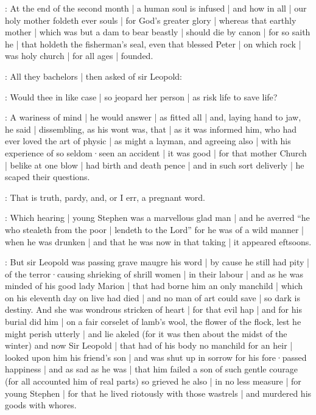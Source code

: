 \stephen:
At the end of the second month |
a human soul is infused |
and how in all |
our holy mother foldeth ever souls |
for God's greater glory |
whereas that earthly mother |
which was but a dam to bear beastly |
should die by canon |
for so saith he |
that holdeth the fisherman's seal,
even that blessed Peter |
on which rock |
was holy church |
for all ages |
founded.

:
All they bachelors |
then asked of sir Leopold:

\All:
Would thee in like case |
so jeopard her person |
as risk life to save life?

:
A wariness of mind |
he would answer |
as fitted all |
and,
laying hand to jaw,
he said |
dissembling,
as his wont was,
that |
as it was informed him,
who had ever loved the art of physic |
as might a layman,
and agreeing also |
with his experience of so seldom·seen an accident |
it was good |
for that mother Church |
belike at one blow |
had birth and death pence |
and in such sort deliverly |
he scaped their questions.

\dixon:
That is truth,
pardy,
and,
or I err,
a pregnant word.

:
Which hearing |
young Stephen was a marvellous glad man |
and he averred
“he who stealeth from the poor |
lendeth to the Lord”
for he was of a wild manner |
when he was drunken |
and that he was now in that taking |
it appeared eftsoons.


:
But sir Leopold was passing grave maugre his word |
by cause he still had pity |
of the terror·causing shrieking of shrill women |
in their labour |
and as he was minded of his good lady Marion |
that had borne him an only manchild |
which on his eleventh day on live had died |
and no man of art could save |
so dark is destiny.
And she was wondrous stricken of heart |
for that evil hap |
and for his burial did him |
on a fair corselet of lamb's wool,
the flower of the flock,
lest he might perish utterly |
and lie akeled
(for it was then about the midst of the winter)
and now Sir Leopold |
that had of his body no manchild for an heir |
looked upon him his friend's son |
and was shut up in sorrow for his fore·passed happiness |
and as sad as he was |
that him failed a son of such gentle courage
(for all accounted him of real parts)
so grieved he also |
in no less measure |
for young Stephen |
for that he lived riotously with those wastrels |
and murdered his goods with whores.

